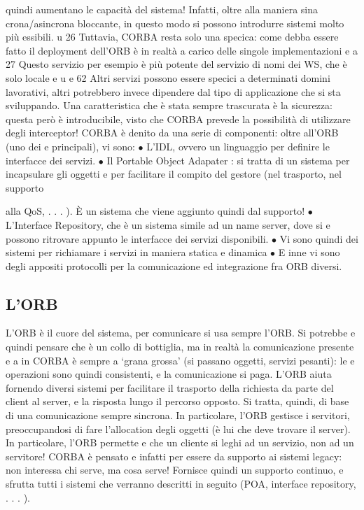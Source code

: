 quindi aumentano le capacità del sistema! Infatti, oltre alla maniera sina
crona/asincrona bloccante, in questo modo si possono introdurre sistemi
molto più essibili.
u
26 Tuttavia, CORBA resta solo una specica: come debba essere fatto il deployment
dell'ORB è in realtà a carico delle singole implementazioni
e
a
27 Questo servizio per esempio è più potente del servizio di nomi dei WS, che è solo locale
e u
e
62
Altri servizi possono essere specici a determinati domini lavorativi, altri potrebbero invece dipendere dal tipo di
applicazione che si sta sviluppando.
Una caratteristica che è stata sempre trascurata è la sicurezza: questa però è introducibile, visto che CORBA prevede 
la possibilità di utilizzare degli interceptor!
CORBA è denito da una serie di componenti: oltre all'ORB (uno dei
e
principali), vi sono:
$\bullet$ L'IDL, ovvero un linguaggio per definire le interfacce dei servizi.
$\bullet$ Il Portable Object Adapater : si tratta di un sistema per incapsulare gli
oggetti e per facilitare il compito del gestore (nel trasporto, nel supporto

alla QoS, . . . ). È un sistema che viene aggiunto quindi dal supporto!
$\bullet$ L'Interface Repository, che è un sistema simile ad un name server, dove si
e
possono ritrovare appunto le interfacce dei servizi disponibili.
$\bullet$ Vi sono quindi dei sistemi per richiamare i servizi in maniera statica e
dinamica
$\bullet$ E inne vi sono degli appositi protocolli per la comunicazione ed integrazione fra ORB diversi.
\subsection{L'ORB}
L'ORB è il cuore del sistema, per comunicare si usa sempre l'ORB. Si potrebbe
e
quindi pensare che è un collo di bottiglia, ma in realtà la comunicazione presente
e
a
in CORBA è sempre a {`}grana grossa' (si passano oggetti, servizi pesanti): le
e
operazioni sono quindi consistenti, e la comunicazione si paga. L'ORB aiuta
fornendo diversi sistemi per facilitare il trasporto della richiesta da parte del
client al server, e la risposta lungo il percorso opposto. Si tratta, quindi, di base
di una comunicazione sempre sincrona.
In particolare, l'ORB gestisce i servitori, preoccupandosi di fare l'allocation
degli oggetti (è lui che deve trovare il server). In particolare, l'ORB permette
e
che un cliente si leghi ad un servizio, non ad un servitore! CORBA è pensato
e
infatti per essere da supporto ai sistemi legacy: non interessa chi serve, ma
cosa serve! Fornisce quindi un supporto continuo, e sfrutta tutti i sistemi che
verranno descritti in seguito (POA, interface repository, . . . ).
